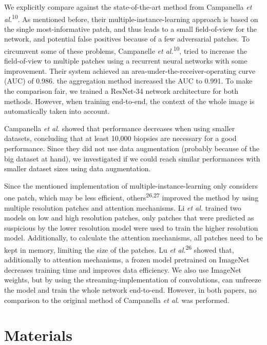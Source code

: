 \documentclass[
  12pt,
  a5,margin=2cmpaper,
]{article}
\begin{document}
We explicitly compare against the state-of-the-art method from
Campanella \emph{et al.}\textsuperscript{10}. As mentioned before, their
multiple-instance-learning approach is based on the single
most-informative patch, and thus leads to a small field-of-view for the
network, and potential false positives because of a few adversarial
patches. To circumvent some of these problems, Campanelle \emph{et
al.}\textsuperscript{10}, tried to increase the field-of-view to
multiple patches using a recurrent neural networks with some
improvement. Their system achieved an area-under-the-receiver-operating
curve (AUC) of 0.986. the aggregation method increased the AUC to 0.991.
To make the comparison fair, we trained a ResNet-34 network architecture
for both methods. However, when training end-to-end, the context of the
whole image is automatically taken into account.

Campanella \emph{et al.} showed that performance decreases when using
smaller datasets, concluding that at least 10,000 biopsies are necessary
for a good performance. Since they did not use data augmentation
(probably because of the big dataset at hand), we investigated if we
could reach similar performances with smaller dataset sizes using data
augmentation.

Since the mentioned implementation of multiple-instance-learning only
considers one patch, which may be less efficient,
others\textsuperscript{26,27} improved the method by using multiple
resolution patches and attention mechanisms. Li \emph{et al.} trained
two models on low and high resolution patches, only patches that were
predicted as suspicious by the lower resolution model were used to train
the higher resolution model. Additionally, to calculate the attention
mechanisms, all patches need to be kept in memory, limiting the size of
the patches. Lu \emph{et al.}\textsuperscript{26} showed that,
additionally to attention mechanisms, a frozen model pretrained on
ImageNet decreases training time and improves data efficiency. We also
use ImageNet weights, but by using the streaming-implementation of
convolutions, can unfreeze the model and train the whole network
end-to-end. However, in both papers, no comparison to the original
method of Campanella \emph{et al.} was performed.

\hypertarget{materials}{%
\section{Materials}\label{materials}}
\end{document}
